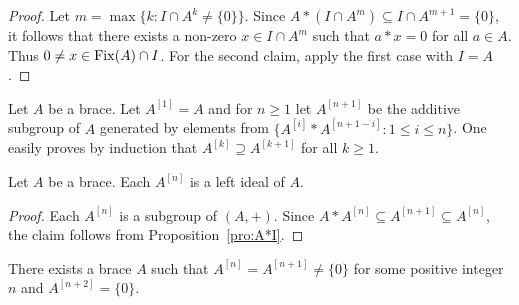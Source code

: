 \begin{proof}
    Let $m=\max\{k:I\cap A^k\ne\{0\}\}$. Since
    $A*(I\cap A^m)\subseteq I\cap A^{m+1}=\{0\}$,
    it follows that there exists a non-zero $x\in I\cap A^m$ such that $a*x=0$
    for all $a\in A$. Thus $0\ne x\in\operatorname{Fix}(A)\cap I$.
    For the second claim, apply the first case with $I=A$.
\end{proof}

Let $A$ be a brace.
Let $A^{[1]}=A$ and for $n\geq 1$ let $A^{[n+1]}$ be the
additive subgroup of $A$ generated by elements from
$\{A^{[i]}*A^{[n+1-i]}:1\leq i\leq n\}$.
One easily proves by induction that $A^{[k]}\supseteq
A^{[k+1]}$ for all $k\geq1$. 

\begin{proposition}
    \label{pro:Smoktunowicz}
    Let $A$ be a brace. Each $A^{[n]}$ is a left ideal of $A$.
\end{proposition}

\begin{proof}
    Each $A^{[n]}$ is a subgroup of $(A,+)$. Since
    $A*A^{[n]}\subseteq A^{[n+1]}\subseteq A^{[n]}$, the claim follows from
    Proposition~\ref{pro:A*I}.
\end{proof}

There exists a brace $A$ such that $A^{[n]}=A^{[n+1]}\ne\{0\}$
for some positive integer $n$ and $A^{[n+2]}=\{0\}$.

